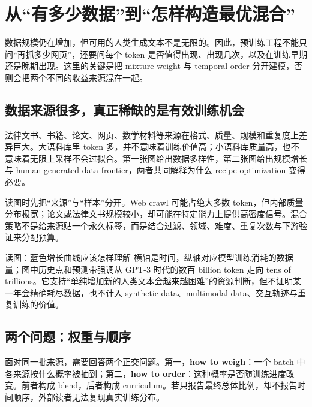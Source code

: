 \section{从“有多少数据”到“怎样构造最优混合”}

数据规模仍在增加，但可用的人类生成文本不是无限的。因此，预训练工程不能只问“再抓多少网页”，还要问每个 token 是否值得出现、出现几次，以及在训练早期还是晚期出现。这里的关键是把 mixture weight 与 temporal order 分开建模，否则会把两个不同的收益来源混在一起。

\subsection{数据来源很多，真正稀缺的是有效训练机会}

法律文书、书籍、论文、网页、数学材料等来源在格式、质量、规模和重复度上差异巨大。大语料库里 token 多，并不意味着训练价值高；小语料库质量高，也不意味着无限上采样不会过拟合。第一张图给出数据多样性，第二张图给出规模增长与 human-generated data frontier，两者共同解释为什么 recipe optimization 变得必要。


读图时先把“来源”与“样本”分开。Web crawl 可能占绝大多数 token，但内部质量分布极宽；论文或法律文书规模较小，却可能在特定能力上提供高密度信号。混合策略不是给来源贴一个永久标签，而是结合过滤、领域、难度、重复次数与下游验证来分配预算。


\begin{knowledgebox}{读图：蓝色增长曲线应该怎样理解}
横轴是时间，纵轴对应模型训练消耗的数据量；图中历史点和预测带强调从 GPT-3 时代的数百 billion token 走向 tens of trillions。它支持“单纯增加新的人类文本会越来越困难”的资源判断，但不证明某一年会精确耗尽数据，也不计入 synthetic data、multimodal data、交互轨迹与重复训练的价值。
\end{knowledgebox}

\subsection{两个问题：权重与顺序}

面对同一批来源，需要回答两个正交问题。第一，\textbf{how to weigh}：一个 batch 中各来源按什么概率被抽到；第二，\textbf{how to order}：这种概率是否随训练进度改变。前者构成 blend，后者构成 curriculum。若只报告最终总体比例，却不报告时间顺序，外部读者无法复现真实训练分布。

